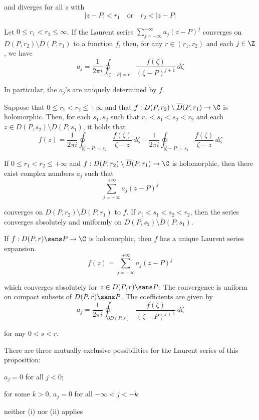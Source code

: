 and diverges for all $z$ with
$$
  |z-P|<r_1\quad\text{or}\quad r_2<|z-P|
$$

\label{eafd61e}

Let $0\leq r_1<r_2\leq\infty$. If the Laurent series
$\sum_{j=-\infty}^{+\infty}a_j(z-P)^j$ converges on $D(P,r_2)\setminus\overline
D(P,r_1)$ to a function $f$, then, for any $r\in(r_1,r_2)$ and each $j\in\Z$,
we have
$$
  a_j=\frac1{2\pi i}\oint_{|\zeta-P|=r}\frac{f(\zeta)}{(\zeta-P)^{j+1}}\,d\zeta
$$

In particular, the $a_j$'s are uniquely determined by $f$.

\label{ca5d89e}

Suppose that $0\leq r_1<r_2\leq+\infty$ and that $f:D(P,r_2)\setminus\overline
D(P,r_1)\to\C$ is holomorphic. Then, for each $s_1,s_2$ such that
$r_1<s_1<s_2<r_2$ and each $z\in D(P,s_2)\setminus\overline D(P,s_1)$, it holds
that
$$
  f(z)=\frac1{2\pi i}\oint_{|\zeta-P|=s_2}\frac{f(\zeta)}{\zeta-z}\,d\zeta
  -\frac1{2\pi i}\oint_{|\zeta-P|=s_1}\frac{f(\zeta)}{\zeta-z}\,d\zeta
$$

\label{cd93e84}

If $0\leq r_1<r_2\leq+\infty$ and $f:D(P,r_2)\setminus\overline D(P,r_1)\to\C$
is holomorphic, then there exist complex numbers $a_j$ such that
$$
  \sum_{j=-\infty}^{+\infty}a_j(z-P)^j
$$

converges on $D(P,r_2)\setminus\overline D(P,r_1)$ to $f$. If
$r_1<s_1<s_2<r_2$, then the series converges absolutely and uniformly on
$D(P,s_2)\setminus\overline D(P,s_1)$.

\label{e7fa5f8}

If $f:D(P,r)\sans P\to\C$ is holomorphic, then $f$ has a unique Laurent series
expansion.
$$
  f(z)=\sum_{j=-\infty}^{+\infty}a_j(z-P)^j
$$

which converges absolutely for $z\in D(P,r)\sans P$. The convergence is uniform
on compact subsets of $D(P,r)\sans P$. The coefficients are given by
$$
  a_j=\frac1{2\pi i}\oint_{\partial D(P,s)}\frac{f(\zeta)}{(\zeta-P)^{j+1}}\,d\zeta
$$

for any $0<s<r$.

There are three mutually exclusive possibilities for the Laurent series of this
proposition:
\begin{enumerati}
  \item $a_j=0$ for all $j<0$;
  \item for some $k>0$, $a_j=0$ for all $-\infty<j<-k$
  \item neither (i) nor (ii) applies
\end{enumerati}

